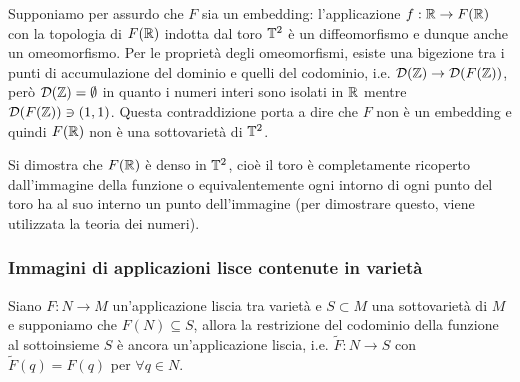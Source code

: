 Supponiamo per assurdo che $ F $ sia un embedding: l'applicazione $ f : \mathbb{R} \to F(\mathbb{R}) $ con la topologia di $ F(\mathbb{R}) $ indotta dal toro $ \mathbb{T}^{2} $ è un diffeomorfismo e dunque anche un omeomorfismo. Per le proprietà degli omeomorfismi, esiste una bigezione tra i punti di accumulazione del dominio e quelli del codominio, i.e. $ \mathcal{D}(\mathbb{Z}) \to \mathcal{D}(F(\mathbb{Z})) $, però $ \mathcal{D}(\mathbb{Z}) = \emptyset $ in quanto i numeri interi sono isolati in $ \mathbb{R} $ mentre $ \mathcal{D}(F(\mathbb{Z})) \ni (1,1) $. Questa contraddizione porta a dire che $ F $ non è un embedding e quindi $ F(\mathbb{R}) $ non è una sottovarietà di $ \mathbb{T}^{2} $.

\begin{remark}
	Si dimostra che $ F(\mathbb{R}) $ è denso in $ \mathbb{T}^{2} $, cioè il toro è completamente ricoperto dall'immagine della funzione o equivalentemente ogni intorno di ogni punto del toro ha al suo interno un punto dell'immagine (per dimostrare questo, viene utilizzata la teoria dei numeri).
\end{remark}

\subsubsection{Immagini di applicazioni lisce contenute in varietà}

\begin{theorem}
	Siano $ F : N \to M $ un'applicazione liscia tra varietà e $ S \subset M $ una sottovarietà di $ M $ e supponiamo che $ F(N) \subseteq S $, allora la restrizione del codominio della funzione al sottoinsieme $ S $ è ancora un'applicazione liscia, i.e. $ \tilde{F} : N \to S $ con $ \tilde{F}(q) = F(q) $ per $ \forall q \in N $.
\end{theorem}

